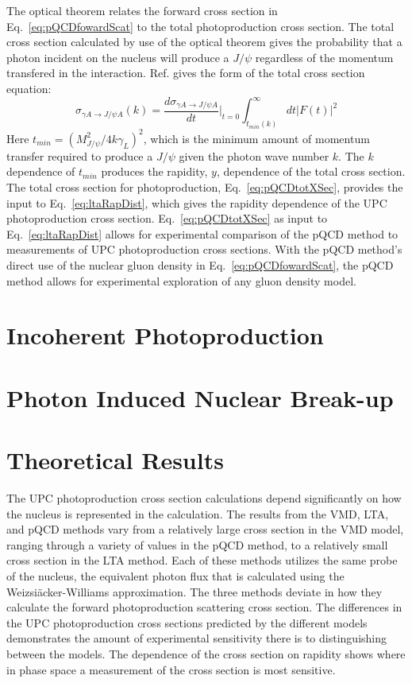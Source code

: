     The optical theorem relates the forward cross section in 
      Eq.~\ref{eq:pQCDfowardScat} to the total photoproduction cross section. 
    The total cross section calculated by use of the optical theorem gives 
      the probability that a photon incident on the nucleus will produce a 
      $J/\psi$ regardless of the momentum transfered in the interaction. 
    Ref. \cite{pQCD2011.08} gives the form of the total cross section equation:
    \begin{equation} \label{eq:pQCDtotXSec}
      \sigma_{\gamma A\rightarrow J/\psi A}(k)=
      \frac{d\sigma_{\gamma A\rightarrow J/\psi A}}{dt}\Big|_{t=0}
      \int_{t_{min}(k)}^{\infty}dt|F(t)|^{2}
    \end{equation} 
    Here $t_{min}=(M_{J/\psi}^{2}/4k\gamma_{L})^2$, which is the minimum amount
      of momentum transfer required to produce a $J/\psi$ given the photon wave
      number $k$.
    The $k$ dependence of $t_{min}$ produces the rapidity, $y$, dependence of
      the total cross section.
    The total cross section for photoproduction, Eq.~\ref{eq:pQCDtotXSec}, 
      provides the input to Eq.~\ref{eq:ltaRapDist}, 
      which gives the rapidity dependence of the UPC photoproduction cross 
      section. 
    Eq.~\ref{eq:pQCDtotXSec} as input to Eq.~\ref{eq:ltaRapDist} allows for 
      experimental comparison of the pQCD method to measurements of UPC 
      photoproduction cross sections. 
    With the pQCD method's direct use of the nuclear gluon density in 
      Eq.~\ref{eq:pQCDfowardScat}, the pQCD method allows for experimental 
      exploration of any gluon density model. 


  \section{Incoherent Photoproduction}


  \section{Photon Induced Nuclear Break-up}


  \section{Theoretical Results}
  The UPC photoproduction cross section calculations depend significantly on 
    how the nucleus is represented in the calculation. 
  The results from the VMD, LTA, and pQCD methods vary from a relatively 
    large cross section in the VMD model, ranging through a variety of values
    in the pQCD method, to a relatively small cross section in the LTA method. 
  Each of these methods utilizes the same probe of the nucleus, the equivalent 
    photon flux that is calculated using the Weizsi\"{a}cker-Williams approximation. 
  The three methods deviate in how they calculate the forward photoproduction
    scattering cross section.
  The differences in the UPC photoproduction cross sections predicted by the 
    different models demonstrates the amount of experimental sensitivity there 
    is to distinguishing between the models. 
  The dependence of the cross section on rapidity shows where in phase space 
    a measurement of the cross section is most sensitive.
   
